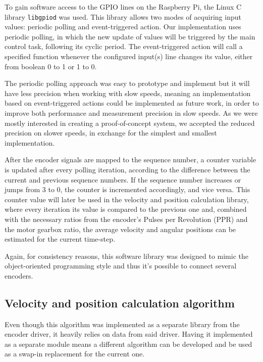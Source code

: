 To gain software access to the GPIO lines on the Raspberry Pi, the Linux C library \verb|libgpiod| \cite{lib:libgpiod} was used.
This library allows two modes of acquiring input values: periodic polling and event-triggered action.
Our implementation uses periodic polling, in which the new update of values will be triggered by the main control task, following its cyclic period.
The event-triggered action will call a specified function whenever the configured input(s) line changes its value, either from boolean 0 to 1 or 1 to 0.

The periodic polling approach was easy to prototype and implement but it will have less precision when working with slow speeds, meaning an implementation based on event-triggered actions could be implemented as future work, in order to improve both performance and measurement precision in slow speeds.
As we were mostly interested in creating a proof-of-concept system, we accepted the reduced precision on slower speeds, in exchange for the simplest and smallest implementation.

After the encoder signals are mapped to the sequence number, a counter variable is updated after every polling iteration, according to the difference between the current and previous sequence numbers.
If the sequence number increases or jumps from 3 to 0, the counter is incremented accordingly, and vice versa.
This counter value will later be used in the velocity and position calculation library, where every iteration its value is compared to the previous one and, combined with the necessary ratios from the encoder's Pulses per Revolution (PPR) and the motor gearbox ratio, the average velocity and angular positions can be estimated for the current time-step.

Again, for consistency reasons, this software library was designed to mimic the object-oriented programming style and thus it's possible to connect several encoders.

\subsection{Velocity and position calculation algorithm}
Even though this algorithm was implemented as a separate library from the encoder driver, it heavily relies on data from said driver.
Having it implemented as a separate module means a different algorithm can be developed and be used as a swap-in replacement for the current one.

